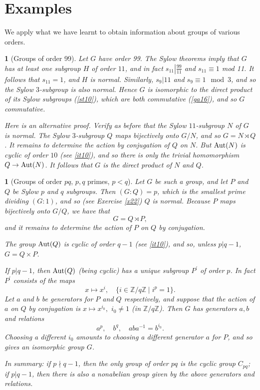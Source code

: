 \documentclass[a4paper,11pt,final]{memoir}%
\newtheorem{plain}[X]{}
\theoremstyle{nonumberplain}
\begin{document}
\section{Examples}

We apply what we have learnt to obtain information about groups of various orders.

\begin{plain}
[Groups of order 99]\label{st12}%
%
Let $G$ have order 99. The Sylow theorems imply that $G$ has at least one
subgroup $H$ of order $11$, and in fact $s_{11}\left\vert \frac{99}%
{11}\right.  $ and $s_{11}\equiv1$ mod 11. It follows that $s_{11}=1$, and $H$
is normal. Similarly, $s_{9}|11$ and $s_{9}\equiv1\mod3$, and so the Sylow
$3$-subgroup is also normal. Hence $G$ is isomorphic to the direct product of
its Sylow subgroups (\ref{st10}), which are both commutative (\ref{ga16}), and
so $G$ commutative.

Here is an alternative proof. Verify as before that the Sylow $11$-subgroup
$N$ of $G$ is normal. The Sylow $3$-subgroup $Q$ maps bijectively onto $G/N$,
and so $G=N\rtimes Q$. It remains to determine the action by conjugation of
$Q$ on $N$. But $\operatorname{Aut}(N)$ is cyclic of order $10$ (see \ref{it10}), and so
there is only the trivial homomorphism $Q\rightarrow\operatorname{Aut}(N)$. It follows that
$G$ is the direct product of $N$ and $Q$.
\end{plain}

\begin{plain}
[Groups of order $pq$, $p,q$ primes, $p<q$]\label{st13}%
%
Let $G$ be such a group, and let $P$ and $Q$ be Sylow $p$ and $q$ subgroups.
Then $(G:Q)=p$, which is the smallest prime dividing $(G:1)$, and so (see
Exercise \ref{x22}) $Q$ is normal. Because $P$ maps bijectively onto $G/Q$, we
have that
\[
G=Q\rtimes P,
\]
and it remains to determine the action of $P$ on $Q$ by conjugation.

The group $\operatorname{Aut}(Q)$ is cyclic of order $q-1$ (see \ref{it10}), and so, unless
$p|q-1$, $G=Q\times P$.

If $p|q-1$, then $\operatorname{Aut}(Q)$ (being cyclic) has a unique subgroup $P^{\prime}$
of order $p$. In fact $P^{\prime}$ consists of the maps
\[
x\mapsto x^{i},\quad\{i\in\mathbb{\mathbb{Z}{}}/q\mathbb{Z}{}\mid i^{p}=1\}.
\]
Let $a$ and $b$ be generators for $P$ and $Q$ respectively, and suppose that
the action of $a$ on $Q$ by conjugation is $x\mapsto x^{i_{0}},$ $i_{0}\neq1$
(in $\mathbb{\mathbb{Z}{}}/q\mathbb{Z}$). Then $G$ has generators $a,b$ and
relations
\[
a^{p},\quad b^{q},\quad aba^{-1}=b^{i_{0}}.
\]
Choosing a different $i_{0}$ amounts to choosing a different generator $a$ for
$P$, and so gives an isomorphic group $G$.

In summary: if $p\nmid q-1$, then the only group of order $pq$ is the cyclic
group $C_{pq}$; if $p|q-1$, then there is also a nonabelian group given by the
above generators and relations.
\end{plain}
\end{document}
